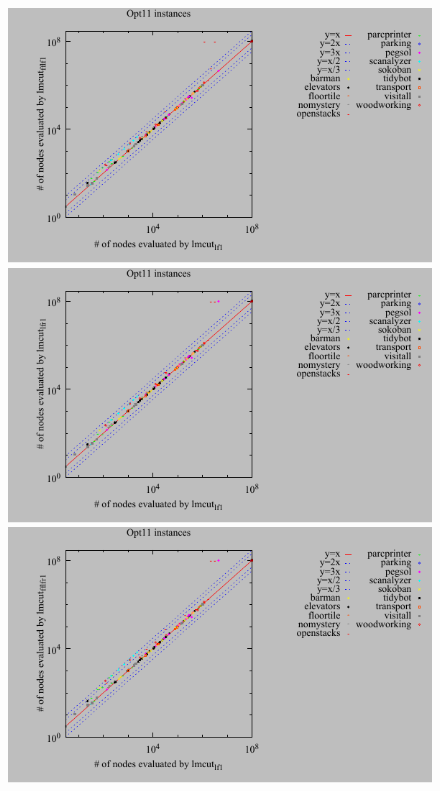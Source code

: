 \begin{figure}[htbp]
 \centering
 \includegraphics{tables/opt11-evaluated-lmcut_lf-lmcut_fflf.pdf}
 \includegraphics{tables/opt11-evaluated-lmcut_lf-lmcut_lfr.pdf}
 \includegraphics{tables/opt11-evaluated-lmcut_lf-lmcut_fflfr.pdf}
 \caption{}
 \label{portfolio-lf}
\end{figure}

